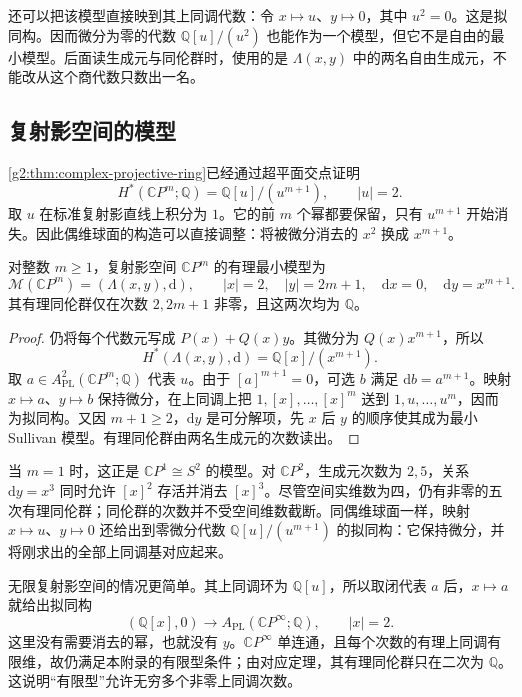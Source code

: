 \ProseParagraphBreak

还可以把该模型直接映到其上同调代数：令 \(x\mapsto u\)、\(y\mapsto0\)，其中 \(u^2=0\)。这是拟同构。因而微分为零的代数 \(\mathbb Q[u]/(u^2)\) 也能作为一个模型，但它不是自由的最小模型。后面读生成元与同伦群时，使用的是 \(\Lambda(x,y)\) 中的两名自由生成元，不能改从这个商代数只数出一名。

\subsection{复射影空间的模型}
\label{g2:subsec:E03:03}

\cref{g2:thm:complex-projective-ring}已经通过超平面交点证明
\[
	H^*(\mathbb CP^m;\mathbb Q)=\mathbb Q[u]/(u^{m+1}),\qquad |u|=2.
\]
取 \(u\) 在标准复射影直线上积分为 \(1\)。它的前 \(m\) 个幂都要保留，只有 \(u^{m+1}\) 开始消失。因此偶维球面的构造可以直接调整：将被微分消去的 \(x^2\) 换成 \(x^{m+1}\)。

\begin{proposition}\label{g2:prop:projective-minimal-model}
	对整数 \(m\geq1\)，复射影空间 \(\mathbb CP^m\) 的有理最小模型为
	\[
		\mathcal M(\mathbb CP^m)=(\Lambda(x,y),\mathrm d),\qquad
		|x|=2,\quad |y|=2m+1,\quad \mathrm dx=0,\quad \mathrm dy=x^{m+1}.
	\]
	其有理同伦群仅在次数 \(2,2m+1\) 非零，且这两次均为 \(\mathbb Q\)。
\end{proposition}
\begin{proof}
	仍将每个代数元写成 \(P(x)+Q(x)y\)。其微分为 \(Q(x)x^{m+1}\)，所以
	\[
		H^*(\Lambda(x,y),\mathrm d)=\mathbb Q[x]/(x^{m+1}).
	\]
	取 \(a\in A_{\mathrm{PL}}^2(\mathbb CP^m;\mathbb Q)\) 代表 \(u\)。由于 \([a]^{m+1}=0\)，可选 \(b\) 满足 \(\mathrm db=a^{m+1}\)。映射 \(x\mapsto a\)、\(y\mapsto b\) 保持微分，在上同调上把 \(1,[x],\ldots,[x]^m\) 送到 \(1,u,\ldots,u^m\)，因而为拟同构。又因 \(m+1\geq2\)，\(\mathrm dy\) 是可分解项，先 \(x\) 后 \(y\) 的顺序使其成为最小 Sullivan 模型。有理同伦群由两名生成元的次数读出。
\end{proof}

当 \(m=1\) 时，这正是 \(\mathbb CP^1\cong S^2\) 的模型。对 \(\mathbb CP^2\)，生成元次数为 \(2,5\)，关系 \(\mathrm dy=x^3\) 同时允许 \([x]^2\) 存活并消去 \([x]^3\)。尽管空间实维数为四，仍有非零的五次有理同伦群；同伦群的次数并不受空间维数截断。同偶维球面一样，映射 \(x\mapsto u\)、\(y\mapsto0\) 还给出到零微分代数 \(\mathbb Q[u]/(u^{m+1})\) 的拟同构：它保持微分，并将刚求出的全部上同调基对应起来。

\ProseParagraphBreak

无限复射影空间的情况更简单。其上同调环为 \(\mathbb Q[u]\)，所以取闭代表 \(a\) 后，\(x\mapsto a\) 就给出拟同构
\[
	(\mathbb Q[x],0)\longrightarrow A_{\mathrm{PL}}(\mathbb CP^\infty;\mathbb Q),\qquad |x|=2.
\]
这里没有需要消去的幂，也就没有 \(y\)。\(\mathbb CP^\infty\) 单连通，且每个次数的有理上同调有限维，故仍满足本附录的有限型条件；由对应定理，其有理同伦群只在二次为 \(\mathbb Q\)。这说明“有限型”允许无穷多个非零上同调次数。

